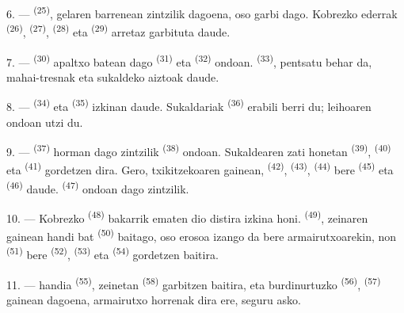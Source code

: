 \VUsaut{4.0mm}
\VUsaut{3.0mm}

6. ---  \textsuperscript{(25)}, gelaren barrenean
zintzilik dagoena, oso garbi dago. Kobrezko  ederrak
\textsuperscript{(26)},  \textsuperscript{(27)},
 \textsuperscript{(28)} eta 
\textsuperscript{(29)} arretaz garbituta daude.

7. ---  \textsuperscript{(30)} apaltxo batean dago
 \textsuperscript{(31)} eta 
\textsuperscript{(32)} ondoan.  \textsuperscript{(33)}, pentsatu
behar da, mahai-tresnak eta sukaldeko aiztoak daude.

8. ---  \textsuperscript{(34)} eta 
\textsuperscript{(35)} izkinan daude. Sukaldariak 
\textsuperscript{(36)} erabili berri du; leihoaren ondoan utzi du.

9. ---  \textsuperscript{(37)} horman dago zintzilik
 \textsuperscript{(38)} ondoan. Sukaldearen zati honetan
 \textsuperscript{(39)}, 
\textsuperscript{(40)} eta  \textsuperscript{(41)}
gordetzen dira. Gero, txikitzekoaren gainean, 
\textsuperscript{(42)},  \textsuperscript{(43)},
 \textsuperscript{(44)} bere 
\textsuperscript{(45)} eta  \textsuperscript{(46)} daude.
 \textsuperscript{(47)} ondoan dago zintzilik.

10. --- Kobrezko  \textsuperscript{(48)} bakarrik ematen dio
distira izkina honi.  \textsuperscript{(49)}, zeinaren gainean
 handi bat \textsuperscript{(50)} baitago, oso erosoa izango da
bere armairutxoarekin, non  \textsuperscript{(51)} bere
 \textsuperscript{(52)}, 
\textsuperscript{(53)} eta  \textsuperscript{(54)}
gordetzen baitira.

\VUsaut{4.0mm}
\VUsaut{3.0mm}

11. ---  handia \textsuperscript{(55)}, zeinetan 
\textsuperscript{(58)} garbitzen baitira, eta burdinurtuzko 
\textsuperscript{(56)},  \textsuperscript{(57)}
gainean dagoena, armairutxo horrenak dira ere, seguru asko.

